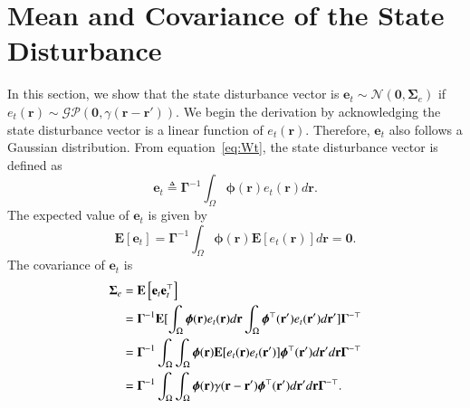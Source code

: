 \documentclass[review,authoryear,3p]{elsarticle}
\begin{document}
\section{Mean and Covariance of the State Disturbance }\label{App:ColoredNoise} 
In this section, we show that the state disturbance vector is $\mathbf{e}_t\sim\mathcal{N}(\mathbf 0,\boldsymbol\Sigma_e)$ if $e_t(\mathbf{r})\sim\mathcal{GP}\left(\mathbf 0,\gamma(\mathbf{r}-\mathbf{r}')\right)$. We begin the derivation by acknowledging the state disturbance vector is a linear function of $e_t(\mathbf r)$. Therefore, $\mathbf{e}_t$ also follows a Gaussian distribution. From equation~\ref{eq:Wt}, the state disturbance vector is defined as
\begin{equation}
	\mathbf{e}_t \triangleq \boldsymbol{\Gamma}^{-1}\int_\Omega {\boldsymbol{\phi} ( \mathbf{r} )e_t( \mathbf{r} )d\mathbf{r}}.
\end{equation}
The expected value of $\mathbf e_t$ is given by 
\begin{equation}
	\mathbf E\left[ \mathbf e_t\right]= \mathbf{\Gamma}^{-1}\int_{\Omega}\boldsymbol\phi\left(\mathbf{r}\right)\mathbf E\left[e_t\left(\mathbf{r}\right)\right] d\mathbf{r}=\mathbf 0.
\end{equation}
The covariance of $\mathbf{e}_t$ is 
\begin{align}
	\boldsymbol\Sigma_e &=\lefteqn{\mathbf E\left[ \mathbf e_t\mathbf e_t^\top\right]} \nonumber \\ 
&=\mathbf{\Gamma}^{-1}\mathbf E[\int_{\Omega}\boldsymbol{\phi}(\mathbf{r})e_t(\mathbf{r})d\mathbf{r} \int_{\Omega}\boldsymbol{\phi}^{\top}(\mathbf{r}') e_t(\mathbf{r}')d\mathbf{r}']\mathbf{\Gamma}^{- \top} \nonumber \\
	&=\mathbf{\Gamma}^{-1}\int_{\Omega}\int_{\Omega} \boldsymbol{\phi}(\mathbf{r}) \mathbf E[e_t(\mathbf{r})e_t(\mathbf{r}')]\boldsymbol{\phi}^{\top}(\mathbf{r}')d\mathbf{r}' d\mathbf r\mathbf{\Gamma}^{- \top} \nonumber\\
	&=\mathbf{\Gamma}^{-1}\int_{\Omega}\int_{\Omega}\boldsymbol{\phi}(\mathbf r) \gamma(\mathbf r- \mathbf r' )\boldsymbol{\phi}^{\top}(\mathbf r')d\mathbf r' d\mathbf r\mathbf{\Gamma}^{-\top}.
\end{align}
\end{document}
